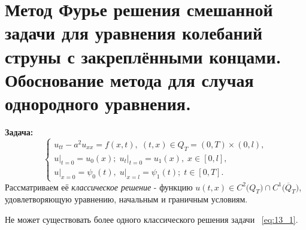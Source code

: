 \documentclass[../main.tex]{subfiles}
\begin{document}
\section{Метод Фурье решения смешанной задачи для уравнения колебаний струны с закреплёнными концами. Обоснование метода для случая однородного уравнения.}
\textbf{Задача:}
\begin{equation}
\label{eq:13_1}
\begin{cases}
	u_{tt} - a^2u_{xx} = f(x, t),\; (t, x) \in Q_{T} = (0, T) \times (0, l), \\
    u\bigr|_{t = 0} = u_{0}(x);\; u_{t}\bigr|_{t =0} = u_{1}(x),\; x \in [0, l], \\
    u\bigr|_{x = 0} = \psi_{0}(t),\; u\bigr|_{x = l} = \psi_{1}(t);\; t \in [0, T].
\end{cases}
\end{equation}
Рассматриваем её \textit{классическое решение} - функцию $u(t, x) \in C^{2}\bigl(Q_{T}\bigr) \cap C^{1}\bigl(\overline{Q}_{T}\bigr)$, удовлетворяющую уравнению, начальным и граничным условиям. \\
\begin{theorem}[Единственности]
Не может существовать более одного классического решения задачи ~\ref{eq:13_1}.
\end{theorem}
\end{document}
